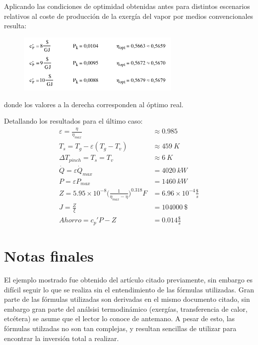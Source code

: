 \documentclass[12pt, letterpaper]{article}
\begin{document}
Aplicando las condiciones de optimidad obtenidas antes para distintos escenarios relativos al coste de producción de la exergía del vapor por medios convencionales resulta:

\begin{figure}[H]
	\centering
	\includegraphics[width=0.7\textwidth]{table.png}
\end{figure}

donde los valores a la derecha corresponden al óptimo real.

Detallando los resultados para el último caso:
\begin{equation}
	\begin{split}
		\varepsilon = \frac{\eta}{\eta_{max}} &\approx  0.985\\
		T_s = T_g - \varepsilon (T_g - T_v) &\approx 459\ K\\
		\Delta T_{pinch} = T_s = T_v &\approx 6\ K\\
		\dot{Q} = \varepsilon \dot{Q}_{max} &= 4020\ kW\\
		P = \varepsilon P_{max} &= 1460\ kW\\
		Z = 5.95 \times 10^{-8} \Bigg( \frac{1}{\eta_{max} - \eta}\Bigg)^{0.318} F &= 6.96 \times 10^{-4} \frac{\$}{s}\\
		J = \frac{Z}{\xi} &= 104000\ \$\\
		Ahorro = c_p' P - Z &= 0.014 \frac{\$}{s}
	\end{split}
\end{equation}

\section*{Notas finales}

El ejemplo mostrado fue obtenido del artículo citado previamente, sin embargo es difícil seguir lo que se realiza sin el entendimiento de las fórmulas utilizadas. Gran parte de las fórmulas utilizadas son derivadas en el mismo documento citado, sin embargo gran parte del análsisi termodinámico (exergías, transferencia de calor, etcétera) se asume que el lector lo conoce de antemano. A pesar de esto, las fórmulas utilzadas no son tan complejas, y resultan sencillas de utilizar para encontrar la inversión total a realizar.

\renewcommand\refname{Referencias}
\printbibliography
\end{document}
